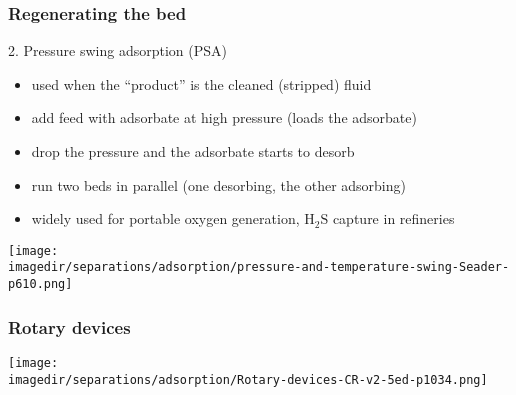 \begin{frame}\frametitle{Regenerating the bed}
	2.	Pressure swing adsorption (PSA)
	\begin{itemize}
		\item	used when the ``product'' is the cleaned (stripped) fluid
		\item	add feed with adsorbate at high pressure (loads the adsorbate)
		\item	drop the pressure and the adsorbate starts to desorb
		\item	run two beds in parallel (one desorbing, the other adsorbing)
		\item	widely used for portable oxygen generation, $\text{H}_2\text{S}$ capture in refineries
	\end{itemize}
	\begin{center}
		\texttt{[image: \\imagedir/separations/adsorption/pressure-and-temperature-swing-Seader-p610.png]}
	\end{center}
	\vspace{-12pt}
\end{frame}

\begin{frame}\frametitle{Rotary devices}
	\begin{center}
		\texttt{[image: \\imagedir/separations/adsorption/Rotary-devices-CR-v2-5ed-p1034.png]}
	\end{center}
	\vspace{-12pt}
\end{frame}


